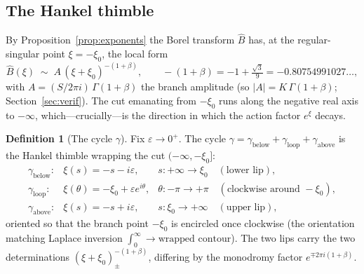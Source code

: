 \documentclass[11pt,reqno]{amsart}
\renewcommand{\_}{\vquadorigunderscore\allowbreak}
\theoremstyle{plain}
\theoremstyle{definition}
\newtheorem{definition}[theorem]{Definition}
\newcommand{\Bhat}{\widehat{B}}
\newcommand{\xizero}{\xi_0}
\begin{document}
\subsection{The Hankel thimble}
By Proposition~\ref{prop:exponents} the Borel transform $\Bhat$ has, at the regular-singular
point $\xi=-\xizero$, the local form
\begin{equation}\label{eq:branch-local}
  \Bhat(\xi)\;\sim\;A\,(\xi+\xizero)^{-(1+\beta)},\qquad
  -(1+\beta)=-1+\tfrac{\sqrt3}{9}=-0.80754991027\ldots,
\end{equation}
with $A=(S/2\pi i)\,\Gamma(1+\beta)$ the branch amplitude (so $\lvert A\rvert=K\,\Gamma(1+\beta)$;
Section~\ref{sec:verif}). The cut emanating from $-\xizero$ runs along the negative real axis to
$-\infty$, which---crucially---is the direction in which the action factor $e^{\xi}$ decays.

\begin{definition}[The cycle $\gamma$]\label{def:gamma}
Fix $\varepsilon\to0^+$. The cycle $\gamma=\gamma_{\mathrm{below}}+\gamma_{\mathrm{loop}}
+\gamma_{\mathrm{above}}$ is the Hankel thimble wrapping the cut $(-\infty,-\xizero]$:
\[
\begin{array}{lll}
  \gamma_{\mathrm{below}}: & \xi(s)=-s-i\varepsilon, & s:+\infty\to\xizero \quad(\text{lower lip}),\\[2pt]
  \gamma_{\mathrm{loop}}:  & \xi(\theta)=-\xizero+\varepsilon e^{i\theta}, & \theta:-\pi\to+\pi
        \quad(\text{clockwise around }-\xizero),\\[2pt]
  \gamma_{\mathrm{above}}: & \xi(s)=-s+i\varepsilon, & s:\xizero\to+\infty \quad(\text{upper lip}),
\end{array}
\]
oriented so that the branch point $-\xizero$ is encircled once clockwise (the orientation matching
Laplace inversion $\int_0^\infty\!\to\!\text{wrapped contour}$). The two lips carry the two
determinations $(\xi+\xizero)^{-(1+\beta)}_{\pm}$, differing by the monodromy factor
$e^{\mp2\pi i(1+\beta)}$.
\end{definition}
\end{document}
